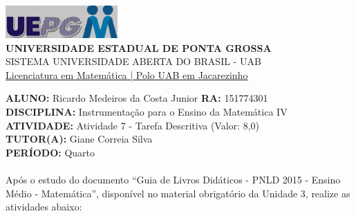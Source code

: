 \documentclass[a4paper, 12pt]{article}
\begin{document}
\begin{flushleft}\includegraphics{logo}\\
\textbf{UNIVERSIDADE ESTADUAL DE PONTA GROSSA} \\
SISTEMA UNIVERSIDADE ABERTA DO BRASIL - UAB \\
\underline{Licenciatura em Matemática | Polo UAB em Jacarezinho}\end{flushleft} 
\textbf{ALUNO:} Ricardo Medeiros da Costa Junior   \textbf{RA:} 151774301 \\
\textbf{DISCIPLINA:} Instrumentação para o Ensino da Matemática IV \\
\textbf{ATIVIDADE:} Atividade 7 - Tarefa Descritiva (Valor: 8,0) \\ 
\textbf{TUTOR(A):} Giane Correia Silva \\ 
\textbf{PERÍODO:} Quarto \\ \\
Após o estudo do documento ``Guia de Livros Didáticos - PNLD 2015 - Ensino Médio - Matemática'', disponível no material obrigatório da Unidade 3, realize as atividades abaixo:
\end{document}
